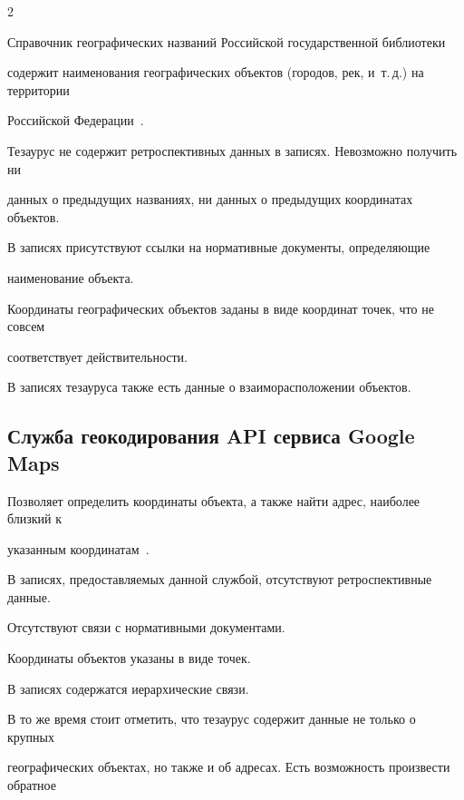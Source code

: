 \begin{multicols}{2}
  

  Справочник географических названий Российской государственной библиотеки 

содержит наименования географических объектов (городов, рек, и~т.\,д.) на территории 

Российской Федерации~\cite{9-sk, 10-sk}.

  

  Тезаурус не содержит ретроспективных данных в записях. Невозможно получить ни 

данных о предыду\-щих названиях, ни данных о предыдущих координатах объектов.

  

  В записях присутствуют ссылки на нормативные документы, определяющие 

наименование объекта.

  

  Координаты географических объектов заданы в виде координат точек, что не совсем 

соответствует действительности.

  

  В записях тезауруса также есть данные о взаиморасположении объектов.

  

  \subsection{Служба геокодирования {API} сервиса Google Maps}

  

  Позволяет определить координаты объекта, а также найти адрес, наиболее близкий к 

указанным координатам~\cite{11-sk}. 

  

  В записях, предоставляемых данной службой, отсутствуют ретроспективные данные. 

Отсутствуют связи с нормативными документами. 

  

  Координаты объектов указаны в виде точек.

  

  В записях содержатся иерархические связи.

  

  В то же время стоит отметить, что тезаурус содержит данные не только о крупных 

географических объектах, но также и об адресах. Есть возможность произвести обратное 


\end{multicols}
